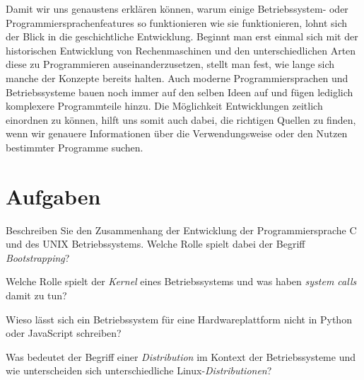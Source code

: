 \documentclass{dcbl/challenge}
\begin{document}
Damit wir uns genaustens erklären können, warum einige Betriebssystem- oder Programmiersprachenfeatures so funktionieren wie sie funktionieren, lohnt sich der Blick in die geschichtliche Entwicklung. 
Beginnt man erst einmal sich mit der historischen Entwicklung von Rechenmaschinen und den unterschiedlichen Arten diese zu Programmieren auseinanderzusetzen, stellt man fest, wie lange sich manche der Konzepte bereits halten. 
Auch moderne Programmiersprachen und Betriebssysteme bauen noch immer auf den selben Ideen auf und fügen lediglich komplexere Programmteile hinzu.
Die Möglichkeit Entwicklungen zeitlich einordnen zu können, hilft uns somit auch dabei, die richtigen Quellen zu finden, wenn wir genauere Informationen über die Verwendungsweise oder den Nutzen bestimmter Programme suchen.

\section*{Aufgaben}
\begin{aufgabe}
    Beschreiben Sie den Zusammenhang der Entwicklung der Programmiersprache C und des UNIX Betriebssystems.
    Welche Rolle spielt dabei der Begriff \textit{Bootstrapping}?
\end{aufgabe}

\begin{aufgabe}
    Welche Rolle spielt der \textit{Kernel} eines Betriebssystems und was haben \textit{system calls} damit zu tun?
\end{aufgabe}

\begin{aufgabe}
    Wieso lässt sich ein Betriebssystem für eine Hardwareplattform nicht in Python oder JavaScript schreiben?
\end{aufgabe}

\begin{aufgabe}
    Was bedeutet der Begriff einer \textit{Distribution} im Kontext der Betriebssysteme und wie unterscheiden sich unterschiedliche Linux-\textit{Distributionen}?
\end{aufgabe}
\end{document}
